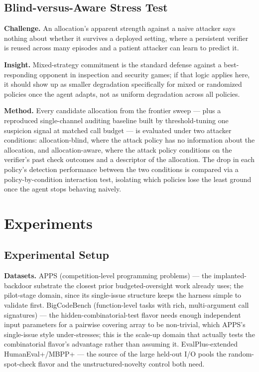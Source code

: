 \documentclass[11pt]{article}
\begin{document}
\subsection{Blind-versus-Aware Stress Test}
\textbf{Challenge.} An allocation's apparent strength against a naive attacker says nothing about whether it survives a deployed setting, where a persistent verifier is reused across many episodes and a patient attacker can learn to predict it.

\textbf{Insight.} Mixed-strategy commitment is the standard defense against a best-responding opponent in inspection and security games; if that logic applies here, it should show up as smaller degradation specifically for mixed or randomized policies once the agent adapts, not as uniform degradation across all policies.

\textbf{Method.} Every candidate allocation from the frontier sweep --- plus a reproduced single-channel auditing baseline built by threshold-tuning one suspicion signal at matched call budget --- is evaluated under two attacker conditions: allocation-blind, where the attack policy has no information about the allocation, and allocation-aware, where the attack policy conditions on the verifier's past check outcomes and a descriptor of the allocation. The drop in each policy's detection performance between the two conditions is compared via a policy-by-condition interaction test, isolating which policies lose the least ground once the agent stops behaving naively.

\section{Experiments}\label{sec:experiments}

\subsection{Experimental Setup}

\textbf{Datasets.} APPS (competition-level programming problems) --- the implanted-backdoor substrate the closest prior budgeted-oversight work already uses; the pilot-stage domain, since its single-issue structure keeps the harness simple to validate first. BigCodeBench (function-level tasks with rich, multi-argument call signatures) --- the hidden-combinatorial-test flavor needs enough independent input parameters for a pairwise covering array to be non-trivial, which APPS's single-issue style under-stresses; this is the scale-up domain that actually tests the combinatorial flavor's advantage rather than assuming it. EvalPlus-extended HumanEval+/MBPP+ --- the source of the large held-out I/O pools the random-spot-check flavor and the unstructured-novelty control both need.
\end{document}
